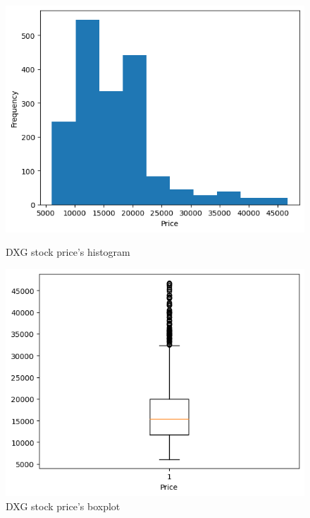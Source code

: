 \documentclass[conference]{IEEEtran}
\begin{document}
\begin{figure}[H]
    \centering
    \begin{minipage}{0.23\textwidth}
    \centering
    \includegraphics[width=1\textwidth]{figures/descriptive_stat/DXG_Histogram.png}
    \caption{DXG stock price's histogram}
    \label{fig_DXG_histogram}
    \end{minipage}
    \hfill
    \begin{minipage}{0.23\textwidth}
    \centering
    \includegraphics[width=1\textwidth]{figures/descriptive_stat/DXG_BoxPlot.png}
    \caption{DXG stock price's boxplot}
    \label{fig_DXG_bp}
    \end{minipage}
\end{figure}
\end{document}
